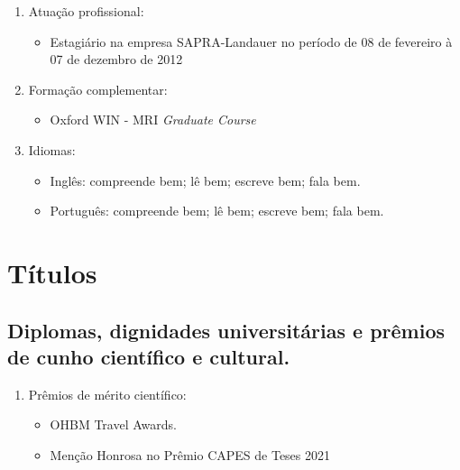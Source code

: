 \documentclass[a4paper,oneside,10pt]{article}
\begin{document}
{\begin{enumerate}
        \item Atuação profissional:
        \begin{itemize}
                \item Estagiário na empresa SAPRA-Landauer no período de 08 de fevereiro à 07 de dezembro de 2012 \mbox{}
        \end{itemize}

        \item Formação complementar:
        \begin{itemize}
                \item Oxford WIN - MRI \textit{Graduate Course} \mbox{} \\
        \end{itemize}

        \item Idiomas:
        \begin{itemize}
                \item Inglês: compreende bem; lê bem; escreve bem; fala bem.
                \item Português: compreende bem; lê bem; escreve bem; fala bem.
        \end{itemize}
\end{enumerate}}

\newpage
\section{Títulos}
\subsection{Diplomas, dignidades universitárias e prêmios de cunho científico e cultural.}
\large{
\begin{enumerate}
        \item Prêmios de mérito científico:
        \begin{itemize}
                \item OHBM Travel Awards. \mbox{} \\
                \item Menção Honrosa no Prêmio CAPES de Teses 2021 \mbox{} \\
        \end{itemize}
\end{enumerate}}
\end{document}
